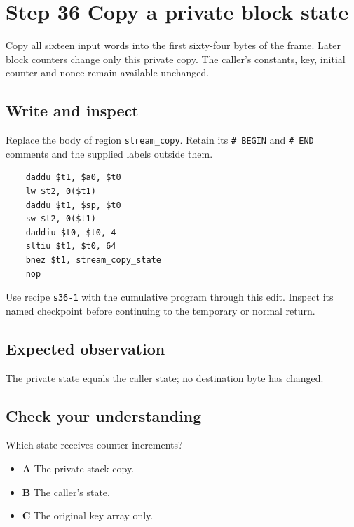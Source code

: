 \section{Step 36 Copy a private block state}\label{chacha-s36}

Copy all sixteen input words into the first sixty-four bytes of the frame. Later block counters change only this private copy. The caller's constants, key, initial counter and nonce remain available unchanged.

\subsection{Write and inspect}
Replace the body of region \texttt{stream\_copy}. Retain its \texttt{\# BEGIN} and \texttt{\# END} comments and the supplied labels outside them.

\begin{verbatim}
    daddu $t1, $a0, $t0
    lw $t2, 0($t1)
    daddu $t1, $sp, $t0
    sw $t2, 0($t1)
    daddiu $t0, $t0, 4
    sltiu $t1, $t0, 64
    bnez $t1, stream_copy_state
    nop
\end{verbatim}

Use recipe \texttt{s36-1} with the cumulative program through this edit. Inspect its named checkpoint before continuing to the temporary or normal return.

\subsection{Expected observation}
The private state equals the caller state; no destination byte has changed.

\subsection{Check your understanding}
Which state receives counter increments?

\begin{itemize}
  \item \textbf{A} The private stack copy.
  \item \textbf{B} The caller's state.
  \item \textbf{C} The original key array only.
\end{itemize}
